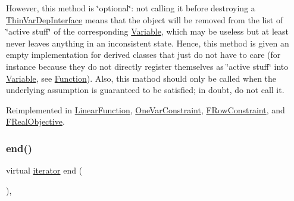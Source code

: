 However, this method is \char`\"{}optional\char`\"{}\+: not calling it before destroying a \mbox{\hyperlink{class_s_m_spp__di__unipi__it_1_1_thin_var_dep_interface}{Thin\+Var\+Dep\+Interface}} means that the object will be removed from the list of \char`\"{}active stuff\char`\"{} of the corresponding \mbox{\hyperlink{class_s_m_spp__di__unipi__it_1_1_variable}{Variable}}, which may be useless but at least never leaves anything in an inconsistent state. Hence, this method is given an empty implementation for derived classes that just do not have to care (for instance because they do not directly register themselves as \char`\"{}active stuff\char`\"{} into \mbox{\hyperlink{class_s_m_spp__di__unipi__it_1_1_variable}{Variable}}, see \mbox{\hyperlink{class_s_m_spp__di__unipi__it_1_1_function}{Function}}). Also, this mathod should only be called when the underlying assumption is guaranteed to be satisfied; in doubt, do not call it. 

Reimplemented in \mbox{\hyperlink{class_s_m_spp__di__unipi__it_1_1_linear_function_a9862fdd31593937c218bbda548c85fcc}{Linear\+Function}}, \mbox{\hyperlink{class_s_m_spp__di__unipi__it_1_1_one_var_constraint_a9862fdd31593937c218bbda548c85fcc}{One\+Var\+Constraint}}, \mbox{\hyperlink{class_s_m_spp__di__unipi__it_1_1_f_row_constraint_a9862fdd31593937c218bbda548c85fcc}{F\+Row\+Constraint}}, and \mbox{\hyperlink{class_s_m_spp__di__unipi__it_1_1_f_real_objective_a9862fdd31593937c218bbda548c85fcc}{F\+Real\+Objective}}.

\mbox{\label{group___thin_var_dep_interface___c_l_a_s_s_e_s_gae1175d5cbc6627e3e49ed9bcb58ffce9}} 
\subsubsection{\texorpdfstring{end()}{end()}\hspace{0.1cm}{\footnotesize\ttfamily [1/2]}}
{\footnotesize\ttfamily virtual \mbox{\hyperlink{class_s_m_spp__di__unipi__it_1_1_thin_var_dep_interface_1_1iterator}{iterator}} end (\begin{DoxyParamCaption}\item[{void}]{ }\end{DoxyParamCaption})\hspace{0.3cm}{\ttfamily [inline]}, {\ttfamily [virtual]}}



